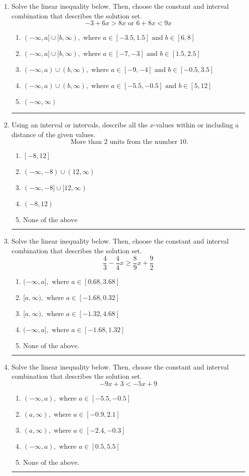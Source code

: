 \documentclass[14pt]{extbook}
\newcommand{\litem}[1]{\item#1\hspace*{-1cm}\rule{\textwidth}{0.4pt}}
\begin{document}
\begin{enumerate}
\litem{
Solve the linear inequality below. Then, choose the constant and interval combination that describes the solution set.\[ -3 + 6 x > 8 x \text{ or } 6 + 8 x < 9 x \]\begin{enumerate}[label=\Alph*.]
\item \( (-\infty, a] \cup [b, \infty), \text{ where } a \in [-3.5, 1.5] \text{ and } b \in [6, 8] \)
\item \( (-\infty, a] \cup [b, \infty), \text{ where } a \in [-7, -3] \text{ and } b \in [1.5, 2.5] \)
\item \( (-\infty, a) \cup (b, \infty), \text{ where } a \in [-9, -4] \text{ and } b \in [-0.5, 3.5] \)
\item \( (-\infty, a) \cup (b, \infty), \text{ where } a \in [-5.5, -0.5] \text{ and } b \in [5, 12] \)
\item \( (-\infty, \infty) \)

\end{enumerate} }
\litem{
Using an interval or intervals, describe all the $x$-values within or including a distance of the given values.\[ \text{ More than } 2 \text{ units from the number } 10. \]\begin{enumerate}[label=\Alph*.]
\item \( [-8, 12] \)
\item \( (-\infty, -8) \cup (12, \infty) \)
\item \( (-\infty, -8] \cup [12, \infty) \)
\item \( (-8, 12) \)
\item \( \text{None of the above} \)

\end{enumerate} }
\litem{
Solve the linear inequality below. Then, choose the constant and interval combination that describes the solution set.\[ \frac{4}{3} - \frac{4}{4} x \geq \frac{8}{9} x + \frac{9}{2} \]\begin{enumerate}[label=\Alph*.]
\item \( (-\infty, a], \text{ where } a \in [0.68, 3.68] \)
\item \( [a, \infty), \text{ where } a \in [-1.68, 0.32] \)
\item \( [a, \infty), \text{ where } a \in [-1.32, 4.68] \)
\item \( (-\infty, a], \text{ where } a \in [-1.68, 1.32] \)
\item \( \text{None of the above}. \)

\end{enumerate} }
\litem{
Solve the linear inequality below. Then, choose the constant and interval combination that describes the solution set.\[ -9x + 3 < -5x + 9 \]\begin{enumerate}[label=\Alph*.]
\item \( (-\infty, a), \text{ where } a \in [-5.5, -0.5] \)
\item \( (a, \infty), \text{ where } a \in [-0.9, 2.1] \)
\item \( (a, \infty), \text{ where } a \in [-2.4, -0.3] \)
\item \( (-\infty, a), \text{ where } a \in [0.5, 5.5] \)
\item \( \text{None of the above}. \)


\end{enumerate}}
\end{enumerate}
\end{document}
